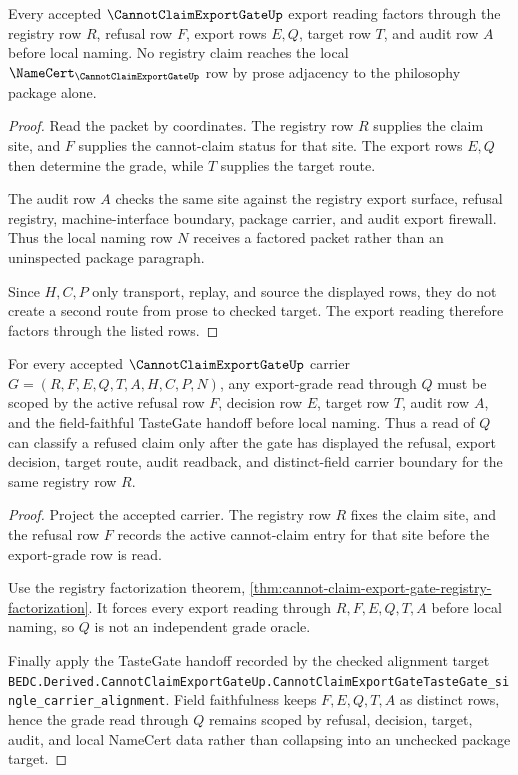 \begin{theorem}
\label{thm:cannot-claim-export-gate-registry-factorization}
Every accepted $\CannotClaimExportGateUp$ export reading factors through the registry row $R$, refusal row $F$, export rows $E,Q$, target row $T$, and audit row $A$ before local naming. No registry claim reaches the local $\NameCert_{\CannotClaimExportGateUp}$ row by prose adjacency to the philosophy package alone.
\end{theorem}
\begin{proof}
Read the packet by coordinates. The registry row $R$ supplies the claim site, and $F$ supplies the cannot-claim status for that site. The export rows $E,Q$ then determine the grade, while $T$ supplies the target route.

The audit row $A$ checks the same site against the registry export surface, refusal registry, machine-interface boundary, package carrier, and audit export firewall. Thus the local naming row $N$ receives a factored packet rather than an uninspected package paragraph.

Since $H,C,P$ only transport, replay, and source the displayed rows, they do not create a second route from prose to checked target. The export reading therefore factors through the listed rows.
\end{proof}

\begin{theorem}
\label{thm:cannot-claim-export-gate-export-grade-scope}
For every accepted $\CannotClaimExportGateUp$ carrier $G=(R,F,E,Q,T,A,H,C,P,N)$, any export-grade read through $Q$ must be scoped by the active refusal row $F$, decision row $E$, target row $T$, audit row $A$, and the field-faithful TasteGate handoff before local naming. Thus a read of $Q$ can classify a refused claim only after the gate has displayed the refusal, export decision, target route, audit readback, and distinct-field carrier boundary for the same registry row $R$.
\end{theorem}
\begin{proof}
Project the accepted carrier. The registry row $R$ fixes the claim site, and the refusal row $F$ records the active cannot-claim entry for that site before the export-grade row is read.

Use the registry factorization theorem, \autoref{thm:cannot-claim-export-gate-registry-factorization}. It forces every export reading through $R,F,E,Q,T,A$ before local naming, so $Q$ is not an independent grade oracle.

Finally apply the TasteGate handoff recorded by the checked alignment target \texttt{BEDC.Derived.CannotClaimExportGateUp.CannotClaimExportGateTasteGate\_single\_carrier\_alignment}. Field faithfulness keeps $F,E,Q,T,A$ as distinct rows, hence the grade read through $Q$ remains scoped by refusal, decision, target, audit, and local NameCert data rather than collapsing into an unchecked package target.
\end{proof}

